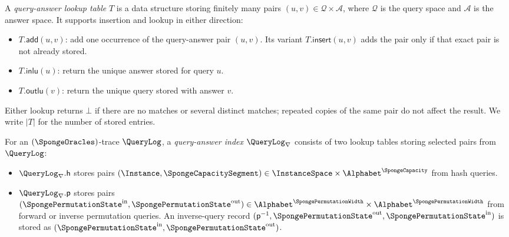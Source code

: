 \begin{definition}
\label{def:dsfs_trace_tables}
\leanok
{}
A \emph{query-answer lookup table} \(T\) is a data structure storing finitely many pairs \((u,v)\in\mathcal Q\times\mathcal A\), where \(\mathcal Q\) is the query space and \(\mathcal A\) is the answer space. It supports insertion and lookup in either direction:
\begin{itemize}
\item \(T.\mathsf{add}(u,v)\): add one occurrence of the query-answer pair \((u,v)\). Its variant \(T.\mathsf{insert}(u,v)\) adds the pair only if that exact pair is not already stored.
\item \(T.\mathsf{inlu}(u)\): return the unique answer stored for query \(u\).
\item \(T.\mathsf{outlu}(v)\): return the unique query stored with answer \(v\).
\end{itemize}
Either lookup returns \(\bot\) if there are no matches or several distinct matches; repeated copies of the same pair do not affect the result. We write \(|T|\) for the number of stored entries.

For an \((\SpongeOracles)\)-trace \(\QueryLog\), a \emph{query-answer index} \(\QueryLog_{\nabla}\) consists of two lookup tables storing selected pairs from \(\QueryLog\):
\begin{itemize}
\item \(\QueryLog_{\nabla}.\mathsf h\) stores pairs \((\Instance,\SpongeCapacitySegment)\in\InstanceSpace\times\Alphabet^{\SpongeCapacity}\) from hash queries.
\item \(\QueryLog_{\nabla}.\mathsf p\) stores pairs \((\SpongePermutationState^{\mathrm{in}},\SpongePermutationState^{\mathrm{out}})\in\Alphabet^{\SpongePermutationWidth}\times\Alphabet^{\SpongePermutationWidth}\) from forward or inverse permutation queries. An inverse-query record \((\mathsf p^{-1},\SpongePermutationState^{\mathrm{out}},\SpongePermutationState^{\mathrm{in}})\) is stored as \((\SpongePermutationState^{\mathrm{in}},\SpongePermutationState^{\mathrm{out}})\).
\end{itemize}


\end{definition}
